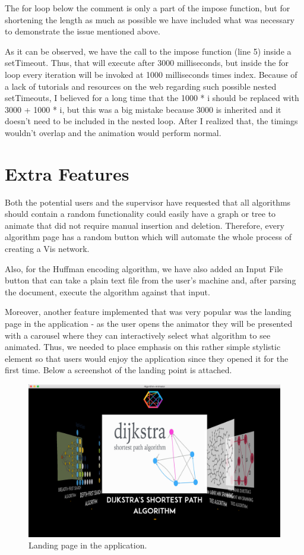 \documentclass{l4proj}
\begin{document}
The for loop below the comment is only a part of the impose function, but for shortening the length as much as possible
we have included what was necessary to demonstrate the issue mentioned above. 

As it can be observed, we have the call to the impose function (line 5) inside a setTimeout. Thus, that will execute
after 3000 milliseconds, but inside the for loop every iteration will be invoked at 1000 milliseconds times index.
Because of a lack of tutorials and resources on the web regarding such possible nested setTimeouts, I believed for a
long time that the 1000 * i should be replaced with 3000 + 1000 * i, but this was a big mistake because 3000 is
inherited and it doesn't need to be included in the nested loop. After I realized that, the timings wouldn't overlap
and the animation would perform normal.

\section{Extra Features}

Both the potential users and the supervisor have requested that all algorithms should contain a random functionality
could easily have a graph or tree to animate that did not require manual insertion and deletion. Therefore, every
algorithm page has a random button which will automate the whole process of creating a Vis network.

Also, for the Huffman encoding algorithm, we have also added an Input File button that can take a plain text file from
the user's machine and, after parsing the document, execute the algorithm against that input. 

Moreover, another feature implemented that was very popular was the landing page in the application - as
the user opens the animator they will be presented with a carousel where they can interactively select what algorithm
to see animated. Thus, we needed to place emphasis on this rather simple stylistic element so that users would enjoy
the application since they opened it for the first time. Below a screenshot of the landing point is attached.

\begin{figure}[!ht]
    \centering
    \includegraphics[scale=0.3]{landing-page}
    \caption{Landing page in the application.}
    \label{fig:landing-page}
\end{figure}
\end{document}
